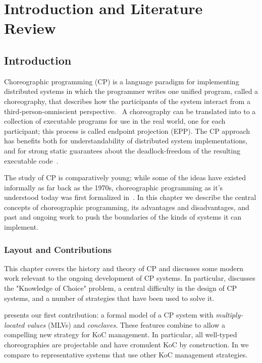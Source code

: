 \chapter{Introduction and Literature Review}

\section{Introduction}
\label{sec:introduction}

Choreographic programming (CP)
is a language paradigm for implementing distributed systems in which the programmer writes one unified program, called a choreography,
that describes how the participants of the system interact
from a third-person-omniscient perspective.~
A choreography can be translated into to a collection of executable programs for use in the real world, one for each participant;
this process is called endpoint projection (EPP).
The CP approach has benefits both for understandability of distributed system implementations,
and for strong static guarantees about the deadlock-freedom of the resulting executable code~\cite{montesi-carbone-dfbd}.

The study of CP is comparatively young; while some of the ideas have existed informally as far back as the 1970s,
choreographic programming as it's understood today was first formalized in~.
In this chapter we describe the central concepts of choreographic programming,
its advantages and disadvantages,
and past and ongoing work to push the boundaries of the kinds of systems it can implement.

\subsection{Layout and Contributions}

This chapter covers the history and theory of CP
and discusses some modern work relevant to the ongoing development of CP systems.
In particular,  discusses the "Knowledge of Choice" problem,
a central difficulty in the design of CP systems,
and a number of strategies that have been used to solve it.

 presents our first contribution:
a formal model of a CP system with
\emph{multiply-located values} (MLVs)
and \emph{conclaves}.
These features combine to allow a compelling new strategy for KoC management.
In particular, all well-typed \HLSCentral choreographies are projectable and have cromulent KoC by construction.
In  we compare \HLSCentral to representative systems that use other KoC management strategies.

